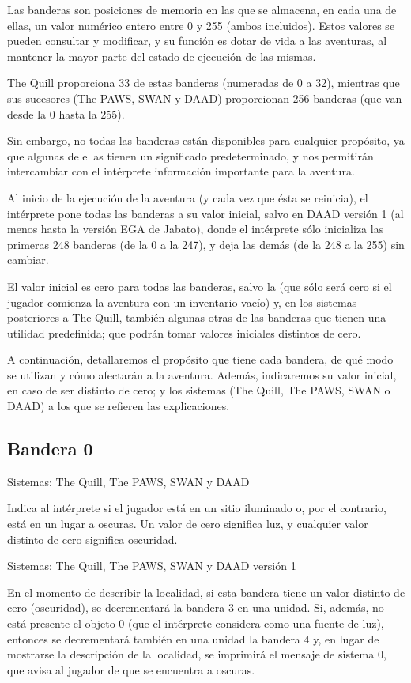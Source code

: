 \documentclass[11pt, a5paper]{article}
\newcommand{\quill}{\textsf{The Quill}\xspace}
\newcommand{\paw}{\textsf{The PAWS}\xspace}
\newcommand{\swan}{\textsf{SWAN}\xspace}
\newcommand{\daad}{\textsf{DAAD}\xspace}
\newcommand{\sistemas}[1]{\noindent Sistemas: #1 \nopagebreak}
\begin{document}
Las banderas son posiciones de memoria en las que se almacena, en cada una de ellas, un valor numérico entero entre 0 y 255 (ambos incluidos). Estos valores se pueden consultar y modificar, y su función es dotar de vida a las aventuras, al mantener la mayor parte del estado de ejecución de las mismas.

\quill proporciona 33 de estas banderas (numeradas de 0 a 32), mientras que sus sucesores (\paw, \swan y \daad) proporcionan 256 banderas (que van desde la 0 hasta la 255).

Sin embargo, no todas las banderas están disponibles para cualquier propósito, ya que algunas de ellas tienen un significado predeterminado, y nos permitirán intercambiar con el intérprete información importante para la aventura.

Al inicio de la ejecución de la aventura (y cada vez que ésta se reinicia), el intérprete pone todas las banderas a su valor inicial, salvo en \daad versión 1 (al menos hasta la versión EGA de Jabato), donde el intérprete sólo inicializa las primeras 248 banderas (de la 0 a la 247), y deja las demás (de la 248 a la 255) sin cambiar.

El valor inicial es cero para todas las banderas, salvo la  (que sólo será cero si el jugador comienza la aventura con un inventario vacío) y, en los sistemas posteriores a \quill, también algunas otras de las banderas que tienen una utilidad predefinida; que podrán tomar valores iniciales distintos de cero.

A continuación, detallaremos el propósito que tiene cada bandera, de qué modo se utilizan y cómo afectarán a la aventura. Además, indicaremos su valor inicial, en caso de ser distinto de cero; y los sistemas (\quill, \paw, \swan o \daad) a los que se refieren las explicaciones.

\subsection{Bandera 0}

\sistemas{\quill, \paw, \swan y \daad}

Indica al intérprete si el jugador está en un sitio iluminado o, por el contrario, está en un lugar a oscuras. Un valor de cero significa luz, y cualquier valor distinto de cero significa oscuridad.

\sistemas{\quill, \paw, \swan y \daad versión 1}

En el momento de describir la localidad, si esta bandera tiene un valor distinto de cero (oscuridad), se decrementará la bandera 3 en una unidad. Si, además, no está presente el objeto 0 (que el intérprete considera como una fuente de luz), entonces se decrementará también en una unidad la bandera 4 y, en lugar de mostrarse la descripción de la localidad, se imprimirá el mensaje de sistema 0, que avisa al jugador de que se encuentra a oscuras.
\end{document}

